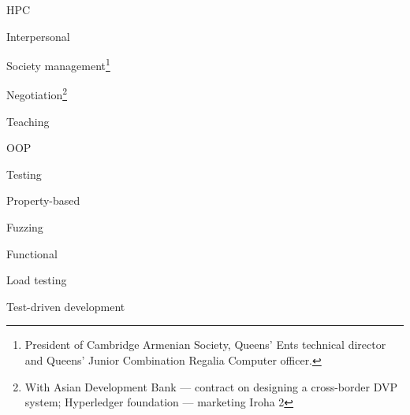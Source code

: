 \documentclass{CurriculumVitae}[10pt, condensed]
\begin{document}
\begin{multicols}{4}
    \begin{skills}{HPC}
    \item {}
    \item {}
    \item {}
    \end{skills}

    \begin{skills}{Interpersonal}
    \item Society management\footnote{President of Cambridge Armenian
        Society, Queens' Ents technical director and Queens' Junior
        Combination Regalia Computer officer. }
    \item Negotiation\footnote{With Asian Development Bank ---
        contract on designing a cross-border DVP system; Hyperledger
        foundation ---  marketing Iroha 2}
    \item Teaching
    \end{skills}

    \begin{skills}{OOP}
    \item {}
    \item {}
    \item {}
    \end{skills}

    
    \begin{skills}{Testing}
    \item {\footnotesize Property-based}
    \item {\footnotesize Fuzzing}
    \item {\footnotesize Functional}
    \item {\footnotesize Load testing}
    \item {\footnotesize Test-driven development}
    \end{skills}
\begin{comment}
  \begin{skills}{Other Languages}
  \item \term{Python}
  \item \term{Bash}
  \item \term{Elisp}
  \end{skills}
\end{comment}
\begin{comment}
  \begin{skills}{OS/Containers}
  \item \term{NixOS}
  \item \term{Linux}\footnote{Mainly Arch-based, but with experience
      of deploying Alpine based containers and static linking}
  \item \term{BSD}
  \item \term{Mac OS X}\footnote{With low-level API knowledge for
      mouse tracking, key-logging, SIP circumvention}
  \end{skills}
\end{comment}
  \end{multicols}
\vfill




\vfill
\end{document}
